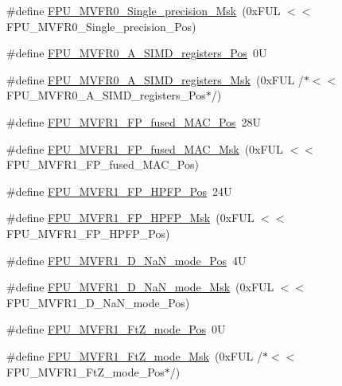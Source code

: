 \begin{DoxyCompactItemize}
\#define \hyperlink{group___c_m_s_i_s___f_p_u_ga95008f205c9d25e4ffebdbdc50d5ae44}{F\+P\+U\+\_\+\+M\+V\+F\+R0\+\_\+\+Single\+\_\+precision\+\_\+\+Msk}~(0x\+F\+U\+L $<$$<$ F\+P\+U\+\_\+\+M\+V\+F\+R0\+\_\+\+Single\+\_\+precision\+\_\+\+Pos)
\item 
\#define \hyperlink{group___c_m_s_i_s___f_p_u_gaa1de44af3e3162c8c176a57564611618}{F\+P\+U\+\_\+\+M\+V\+F\+R0\+\_\+\+A\+\_\+\+S\+I\+M\+D\+\_\+registers\+\_\+\+Pos}~0U
\item 
\#define \hyperlink{group___c_m_s_i_s___f_p_u_ga118f13f9562805356e92b5ad52573021}{F\+P\+U\+\_\+\+M\+V\+F\+R0\+\_\+\+A\+\_\+\+S\+I\+M\+D\+\_\+registers\+\_\+\+Msk}~(0x\+F\+U\+L /$\ast$$<$$<$ F\+P\+U\+\_\+\+M\+V\+F\+R0\+\_\+\+A\+\_\+\+S\+I\+M\+D\+\_\+registers\+\_\+\+Pos$\ast$/)
\item 
\#define \hyperlink{group___c_m_s_i_s___f_p_u_ga68c53771f02f4c73122a7b40796549cc}{F\+P\+U\+\_\+\+M\+V\+F\+R1\+\_\+\+F\+P\+\_\+fused\+\_\+\+M\+A\+C\+\_\+\+Pos}~28U
\item 
\#define \hyperlink{group___c_m_s_i_s___f_p_u_gaf5129ab18948ff573a1ab29f0be47bc2}{F\+P\+U\+\_\+\+M\+V\+F\+R1\+\_\+\+F\+P\+\_\+fused\+\_\+\+M\+A\+C\+\_\+\+Msk}~(0x\+F\+U\+L $<$$<$ F\+P\+U\+\_\+\+M\+V\+F\+R1\+\_\+\+F\+P\+\_\+fused\+\_\+\+M\+A\+C\+\_\+\+Pos)
\item 
\#define \hyperlink{group___c_m_s_i_s___f_p_u_ga02ceac0abcbdc8670633056bec005bfd}{F\+P\+U\+\_\+\+M\+V\+F\+R1\+\_\+\+F\+P\+\_\+\+H\+P\+F\+P\+\_\+\+Pos}~24U
\item 
\#define \hyperlink{group___c_m_s_i_s___f_p_u_gafe29dd327ed3b723b3f01759568e116d}{F\+P\+U\+\_\+\+M\+V\+F\+R1\+\_\+\+F\+P\+\_\+\+H\+P\+F\+P\+\_\+\+Msk}~(0x\+F\+U\+L $<$$<$ F\+P\+U\+\_\+\+M\+V\+F\+R1\+\_\+\+F\+P\+\_\+\+H\+P\+F\+P\+\_\+\+Pos)
\item 
\#define \hyperlink{group___c_m_s_i_s___f_p_u_gae34d7ce42e50e2f1ea3e654fd3ba690a}{F\+P\+U\+\_\+\+M\+V\+F\+R1\+\_\+\+D\+\_\+\+Na\+N\+\_\+mode\+\_\+\+Pos}~4U
\item 
\#define \hyperlink{group___c_m_s_i_s___f_p_u_gad6af7c4632dba5a417307d456fe9b8a7}{F\+P\+U\+\_\+\+M\+V\+F\+R1\+\_\+\+D\+\_\+\+Na\+N\+\_\+mode\+\_\+\+Msk}~(0x\+F\+U\+L $<$$<$ F\+P\+U\+\_\+\+M\+V\+F\+R1\+\_\+\+D\+\_\+\+Na\+N\+\_\+mode\+\_\+\+Pos)
\item 
\#define \hyperlink{group___c_m_s_i_s___f_p_u_ga7faa5bfa85036f8511793234cbbc2409}{F\+P\+U\+\_\+\+M\+V\+F\+R1\+\_\+\+Ft\+Z\+\_\+mode\+\_\+\+Pos}~0U
\item 
\#define \hyperlink{group___c_m_s_i_s___f_p_u_gac566bde39a7afcceffbb21d830c269c1}{F\+P\+U\+\_\+\+M\+V\+F\+R1\+\_\+\+Ft\+Z\+\_\+mode\+\_\+\+Msk}~(0x\+F\+U\+L /$\ast$$<$$<$ F\+P\+U\+\_\+\+M\+V\+F\+R1\+\_\+\+Ft\+Z\+\_\+mode\+\_\+\+Pos$\ast$/)

\end{DoxyCompactItemize}
